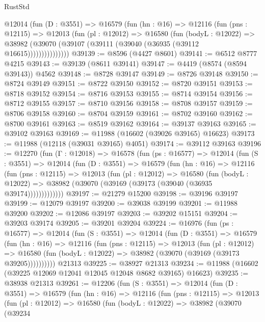 \begin{lexlean}{RustStd}
\begin{coremodule}
          @12014
            (fun (D : @3551) =>
            @16579
              (fun (hn : @16) =>
              @12116
                (fun (pns : @12115) =>
                @12013
                  (fun (pl : @12012) =>
                  @16580
                    (fun (bodyL : @12022) =>
                    @38982 (@39070 (@39107 (@39111 (@39040 (@36935 (@39112 @16615)))))))))))))))
@39139 := @8596 (@4427 @8601)
@39141 := @6512 @8777 @4215
@39143 := @39139 (@8611 @39141)
@39147 := @4419 (@8574 (@8594 @39143)) @4562
@39148 := @8728 @39147
@39149 := @8726 @39148
@39150 := @8724 @39149
@39151 := @8722 @39150
@39152 := @8720 @39151
@39153 := @8718 @39152
@39154 := @8716 @39153
@39155 := @8714 @39154
@39156 := @8712 @39155
@39157 := @8710 @39156
@39158 := @8708 @39157
@39159 := @8706 @39158
@39160 := @8704 @39159
@39161 := @8702 @39160
@39162 := @8700 @39161
@39163 := @8519 @39162
@39164 := @39137 @39163
@39165 := @39102 @39163
@39169 := @11988 (@16602 (@39026 @39165) @16623)
@39173 := @11988 (@12118 (@39031 @39165) @4051)
@39174 := @39112 @39163
@39196 := @12270
    (fun (Γ : @12018) =>
    @16578
      (fun (ps : @16577) =>
      @12014
        (fun (S : @3551) =>
        @12014
          (fun (D : @3551) =>
          @16579
            (fun (hn : @16) =>
            @12116
              (fun (pns : @12115) =>
              @12013
                (fun (pl : @12012) =>
                @16580
                  (fun (bodyL : @12022) =>
                  @38982 (@39070 (@39169 (@39173 (@39040 (@36935 @39174)))))))))))))
@39197 := @21279 @15200
@39198 := @39196 @39197
@39199 := @12079 @39197
@39200 := @39038 @39199
@39201 := @11988 @39200
@39202 := @12086 @39197
@39203 := @39202 @15151
@39204 := @39203 @39174
@39205 := @39201 @39204
@39224 := @16976
    (fun (ps : @16577) =>
    @12014
      (fun (S : @3551) =>
      @12014
        (fun (D : @3551) =>
        @16579
          (fun (hn : @16) =>
          @12116
            (fun (pns : @12115) =>
            @12013
              (fun (pl : @12012) =>
              @16580 (fun (bodyL : @12022) => @38982 (@39070 (@39169 (@39173 @39205))))))))))
    @21313
@39225 := @38927 @21313
@39234 := @11988 (@16602 (@39225 @12069 @12041 @12045 @12048 @8682 @39165) @16623)
@39235 := @38938 @21313
@39261 := @12206
    (fun (S : @3551) =>
    @12014
      (fun (D : @3551) =>
      @16579
        (fun (hn : @16) =>
        @12116
          (fun (pns : @12115) =>
          @12013
            (fun (pl : @12012) =>
            @16580
              (fun (bodyL : @12022) =>
              @38982
                (@39070
                  (@39234

\end{coremodule}
\end{lexlean}
